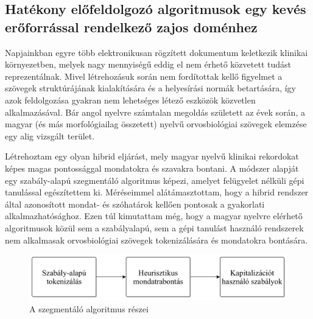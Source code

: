 \subsection{Hatékony előfeldolgozó algoritmusok egy kevés erőforrással rendelkező zajos doménhez}
\label{thes:clin}

Napjainkban egyre több elektronikusan rögzített dokumentum keletkezik klinikai környezetben, melyek nagy mennyiségű eddig el nem érhető közvetett tudást reprezentálnak. 
Mivel létrehozásuk során nem fordítottak kellő figyelmet a szövegek struktúrájának kialakítására és a helyesírási normák betartására, így azok feldolgozása gyakran nem lehetséges létező eszközök közvetlen alkalmazásával. 
Bár angol nyelvre számtalan megoldás született az évek során, a magyar (és más morfológiailag összetett) nyelvű orvosbiológiai szövegek elemzése egy alig vizsgált terület.

% 
% 



\begin{core}
\begin{thesis}%
\label{thes:clin-segment}
Létrehoztam egy olyan hibrid eljárást, mely magyar nyelvű klinikai rekordokat képes magas pontossággal mondatokra és szavakra bontani. 
A módszer alapját egy szabály-alapú szegmentáló algoritmus képezi, amelyet felügyelet nélküli gépi tanulással egészítettem ki. %
Méréseimmel alátámasztottam, hogy a hibrid rendszer által azonosított mondat- és szóhatárok kellően pontosak a gyakorlati alkalmazhatósághoz.
Ezen túl kimutattam még, hogy a magyar nyelvre elérhető algoritmusok közül sem a szabályalapú, sem a gépi tanulást használó rendszerek nem alkalmasak orvosbiológiai szövegek tokenizálására és mondatokra bontására.
\end{thesis}

\begin{pub}
\cite{Orosz2013d, Orosz2014a}
\end{pub}
\end{core}


\begin{figure}[H] %
  \centering
  \includegraphics[scale=0.16]{Clinical/clin_segm_arch_hu.png} 
  \caption{A szegmentáló algoritmus részei}
  \label{fig:clin-segment-arch_en}
\end{figure}


